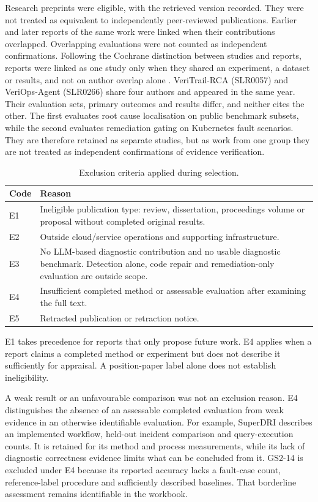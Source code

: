 Research preprints were eligible, with the retrieved version recorded.
They were not treated as equivalent to independently peer-reviewed
publications. Earlier and later reports of the same work were linked when
their contributions overlapped. Overlapping evaluations were not counted
as independent confirmations. Following the Cochrane distinction between studies and
reports, reports were linked as one study only when they shared an
experiment, a dataset or results, and not on author overlap alone
\parencite{li2024cochranech5}. VeriTrail-RCA (SLR0057) and VeriOps-Agent
(SLR0266) share four authors and appeared in the same year. Their
evaluation sets, primary outcomes and results differ, and neither cites
the other. The first evaluates root cause localisation on public benchmark
subsets, while the second evaluates remediation gating on Kubernetes fault
scenarios. They are therefore retained as separate studies, but as work
from one group they are not treated as independent confirmations of
evidence verification.

\begin{table}[htbp]
\centering\small
\caption{Exclusion criteria applied during selection.}
\label{tab:slr:exclusions}
\begin{tabularx}{\textwidth}{@{}lX@{}}
\toprule
Code & Reason \\
\midrule
E1 & Ineligible publication type: review, dissertation, proceedings volume or proposal without completed original results. \\
E2 & Outside cloud/service operations and supporting infrastructure. \\
E3 & No LLM-based diagnostic contribution and no usable diagnostic benchmark. Detection alone, code repair and remediation-only evaluation are outside scope. \\
E4 & Insufficient completed method or assessable evaluation after examining the full text. \\
E5 & Retracted publication or retraction notice. \\
\bottomrule
\end{tabularx}
\end{table}

E1 takes precedence for reports that only propose future work. E4 applies
when a report claims a completed method or experiment but does not describe
it sufficiently for appraisal. A position-paper label alone does not
establish ineligibility.

A weak result or an unfavourable comparison was not an exclusion reason.
E4 distinguishes the absence of an assessable completed evaluation from
weak evidence in an otherwise identifiable evaluation. For example,
SuperDRI describes an implemented workflow, held-out incident comparison
and query-execution counts. It is retained for its method and process
measurements, while its lack of diagnostic correctness evidence limits
what can be concluded from it. GS2-14 is excluded under E4 because its
reported accuracy lacks a fault-case
count, reference-label procedure and sufficiently described baselines.
That borderline assessment remains identifiable in the workbook.

